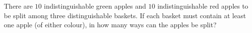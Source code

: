 There are $10$ indistinguishable green apples and $10$ indistinguishable red apples to be split among three distinguishable baskets. If each basket must contain at least one apple (of either colour), in how many ways can the apples be split?

